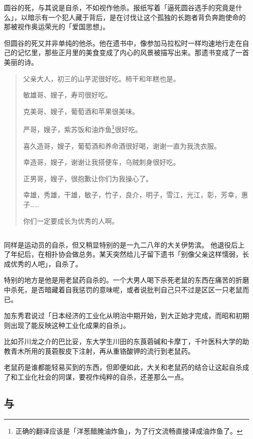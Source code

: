 \documentclass[UTF8]{ctexart}
\begin{document}
圆谷的死，与其说是自杀，不如视作他杀。报纸写着「逼死圆谷选手的究竟是什么」，以暗示有一个犯人藏于背后，是在讨伐让这个孤独的长跑者背负奔跑使命的那被视作奥运荣光的「爱国思想」。

但圆谷的死又并非单纯的他杀。他在遗书中，像参加马拉松时一样均速地行走在自己的记忆里，那些正月里的美食变成了内心的风景被描写出来。那遗书变成了一首美丽的诗。

\begin{verse}
父亲大人，初三的山芋泥很好吃。柿干和年糕也是。

敏雄哥、嫂子，寿司很好吃。

克美哥、嫂子，葡萄酒和苹果很美味。

严哥，嫂子，紫苏饭和油炸鱼\footnote{正确的翻译应该是「洋葱醋腌油炸鱼」，为了行文流畅直接译成油炸鱼了。}很好吃。

喜久造哥，嫂子，葡萄酒和养命酒很好喝，谢谢一直为我洗衣服。

幸造哥，嫂子，谢谢让我搭便车，乌贼刺身很好吃。

正男哥，嫂子，很抱歉让你们为我操心了。

幸雄，秀雄，干雄，敏子，竹子，良介，明子，雪江，光江，彰，芳幸，惠子……

你们一定要成长为优秀的人啊。
\end{verse}

\subsection{}

同样是运动员的自杀，但又稍显特别的是一九二八年的大关伊势滨。
他退役后上了年纪后，在相扑协会做总务。某天突然给儿子留下遗书「别像父亲这样懦弱，长成优秀的人吧」，自杀了。

特别的地方是他是用老鼠药自杀的。一个大男人喝下杀死老鼠的东西在痛苦的折磨中杀死，是否暗藏着自我惩罚的意味呢，或者说批判自己只不过是区区一只老鼠而已。

加东秀君说过「日本经济的工业化从明治中期开始，到大正始才完成，而昭和初期则出现了能反映这种工业化成果的自杀」。

比如芥川龙之介的巴比妥，东大学生川田的东莨菪碱和卡摩丁，千叶医科大学的助教青木所用的茛菪胺皮下注射，再从重铬酸钾的流行到老鼠药。

老鼠药是谁都能轻易买到的东西，但即便如此，大关和老鼠药的结合让这起自杀成了和工业化社会的同谋，要视作纯粹的自杀，还差那么一点。

\subsection{与}
\end{document}
